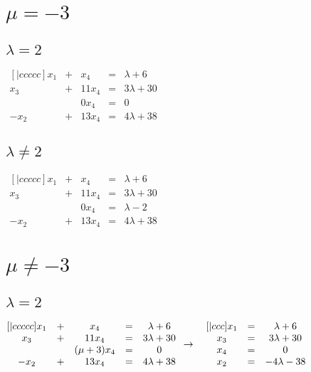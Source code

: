 \documentclass{article}
\begin{document}
    \section{\(\mu = -3\)}
    \subsection{\(\lambda = 2\)}
    \begin{math}
        \begin{matrix}[|ccccc]
            x_1 & + & x_4 & = & \lambda + 6\\
            x_3 & + & 11x_4 & = & 3\lambda + 30\\
            ~ & ~ & 0x_4 & = & 0\\
            -x_2 & + & 13x_4 & = & 4\lambda + 38
        \end{matrix}
    \end{math}
    \subsection{\(\lambda \neq 2\)}
    \begin{math}
        \begin{matrix}[|ccccc]
            x_1 & + & x_4 & = & \lambda + 6\\
            x_3 & + & 11x_4 & = & 3\lambda + 30\\
            ~ & ~ & 0x_4 & = & \lambda - 2\\
            -x_2 & + & 13x_4 & = & 4\lambda + 38
        \end{matrix}
    \end{math}
    \section{\(\mu \neq -3\)}
    \subsection{\(\lambda = 2\)}
    \begin{math}
        \begin{matrix}[|ccccc]
            x_1 & + & x_4 & = & \lambda + 6\\
            x_3 & + & 11x_4 & = & 3\lambda + 30\\
            ~ & ~ & (\mu + 3)x_4 & = & 0\\
            -x_2 & + & 13x_4 & = & 4\lambda + 38
        \end{matrix}\\
        \\
        \\
        \to\quad
        \begin{matrix}[|ccc]
            x_1 & = & \lambda + 6\\
            x_3 & = & 3\lambda + 30\\
            x_4 & = & 0\\
            x_2 & = & -4\lambda - 38
        \end{matrix}
    \end{math}
\end{document}
